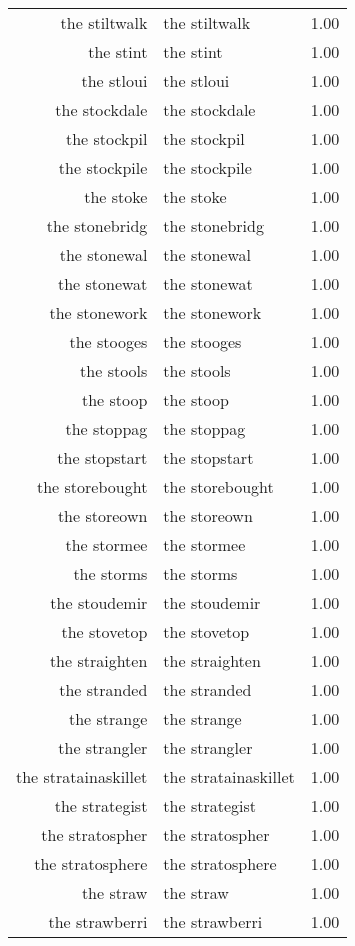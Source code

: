 \begin{table}[ht]
\begin{tabular}{rlr}
  the stiltwalk & the stiltwalk & 1.00 \\ 
  the stint & the stint & 1.00 \\ 
  the stloui & the stloui & 1.00 \\ 
  the stockdale & the stockdale & 1.00 \\ 
  the stockpil & the stockpil & 1.00 \\ 
  the stockpile & the stockpile & 1.00 \\ 
  the stoke & the stoke & 1.00 \\ 
  the stonebridg & the stonebridg & 1.00 \\ 
  the stonewal & the stonewal & 1.00 \\ 
  the stonewat & the stonewat & 1.00 \\ 
  the stonework & the stonework & 1.00 \\ 
  the stooges & the stooges & 1.00 \\ 
  the stools & the stools & 1.00 \\ 
  the stoop & the stoop & 1.00 \\ 
  the stoppag & the stoppag & 1.00 \\ 
  the stopstart & the stopstart & 1.00 \\ 
  the storebought & the storebought & 1.00 \\ 
  the storeown & the storeown & 1.00 \\ 
  the stormee & the stormee & 1.00 \\ 
  the storms & the storms & 1.00 \\ 
  the stoudemir & the stoudemir & 1.00 \\ 
  the stovetop & the stovetop & 1.00 \\ 
  the straighten & the straighten & 1.00 \\ 
  the stranded & the stranded & 1.00 \\ 
  the strange & the strange & 1.00 \\ 
  the strangler & the strangler & 1.00 \\ 
  the stratainaskillet & the stratainaskillet & 1.00 \\ 
  the strategist & the strategist & 1.00 \\ 
  the stratospher & the stratospher & 1.00 \\ 
  the stratosphere & the stratosphere & 1.00 \\ 
  the straw & the straw & 1.00 \\ 
  the strawberri & the strawberri & 1.00 \\ 

\end{tabular}
\end{table}
